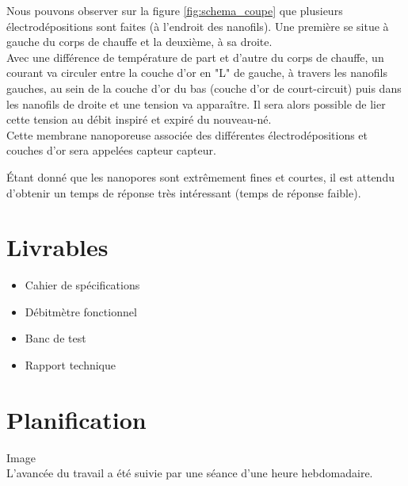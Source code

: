 Nous pouvons observer sur la figure \ref{fig:schema_coupe} que plusieurs électrodépositions sont faites (à l'endroit des nanofils). Une première 
se situe à gauche du corps de chauffe et la deuxième, à sa droite. \\
Avec une différence de température de part et d'autre du corps de chauffe, un courant va circuler entre la couche d'or en "L" de gauche, à 
travers les nanofils gauches, au sein de la couche d'or du bas (couche d'or de court-circuit) puis dans les nanofils de droite et une tension va apparaître. Il sera 
alors possible de lier cette tension au débit inspiré et expiré du nouveau-né.\\
Cette membrane nanoporeuse associée des différentes électrodépositions et couches d'or sera appelées capteur \gls{capteur}. 

Étant donné que les nanopores sont extrêmement fines et courtes, il est attendu d'obtenir un temps de réponse très intéressant (temps 
de réponse faible). 

\section{Livrables}
\begin{itemize}
    \item Cahier de spécifications
    \item Débitmètre fonctionnel
    \item Banc de test
    \item Rapport technique
\end{itemize}
\section{Planification}
Image\\

L'avancée du travail a été suivie par une séance d'une heure hebdomadaire. 

